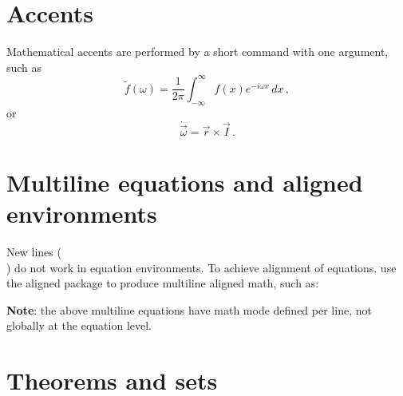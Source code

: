 \section{Accents}
Mathematical accents are performed by a short command with one
argument, such as
\[
        \tilde f(\omega)=\frac{1}{2\pi}
        \int_{-\infty}^\infty f(x)e^{-i\omega x}\,dx\,,
\]
or
\[
        \dot{\vec \omega}=\vec r\times\vec I\,.
\]
\section{Multiline equations and aligned environments}
New lines (\\ ) do not work in equation environments. To achieve alignment of equations, use the aligned  package to produce multiline aligned math, such as:
\newline





\textbf{Note}: the above multiline equations have math mode defined per line, not globally at the equation level.
\section{Theorems and sets}

